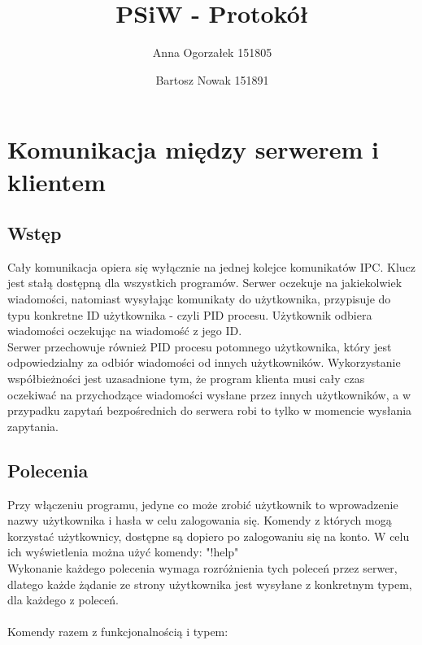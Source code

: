 \documentclass[11pt]{article}
\title{PSiW - Protokół}
\author{Anna Ogorzałek 151805 \and Bartosz Nowak 151891}
\date{}
\begin{document}
	\maketitle
	\section{Komunikacja między serwerem i klientem}
	\subsection{Wstęp}
	Cały komunikacja opiera się wyłącznie na jednej kolejce komunikatów IPC. Klucz jest stałą dostępną dla wszystkich programów. Serwer oczekuje na jakiekolwiek wiadomości, natomiast wysyłając komunikaty do użytkownika, przypisuje do typu konkretne ID użytkownika - czyli PID procesu. Użytkownik odbiera wiadomości oczekując na wiadomość z jego ID.\\
	Serwer przechowuje również PID procesu potomnego użytkownika, który jest odpowiedzialny za odbiór wiadomości od innych użytkowników. Wykorzystanie współbieżności jest uzasadnione tym, że program klienta musi cały czas oczekiwać na przychodzące wiadomości wysłane przez innych użytkowników, a w przypadku zapytań bezpośrednich do serwera robi to tylko w momencie wysłania zapytania. 
	
	\subsection{Polecenia}
	Przy włączeniu programu, jedyne co może zrobić użytkownik to wprowadzenie nazwy użytkownika i hasła w celu zalogowania się. Komendy z których mogą korzystać użytkownicy, dostępne są dopiero po zalogowaniu się na konto. W celu ich wyświetlenia można użyć komendy: "!help"\\
	Wykonanie każdego polecenia wymaga rozróżnienia tych poleceń przez serwer, dlatego każde żądanie ze strony użytkownika jest wysyłane z konkretnym typem, dla każdego z poleceń.\\\\ Komendy razem z funkcjonalnością i typem:
	
\end{document}
